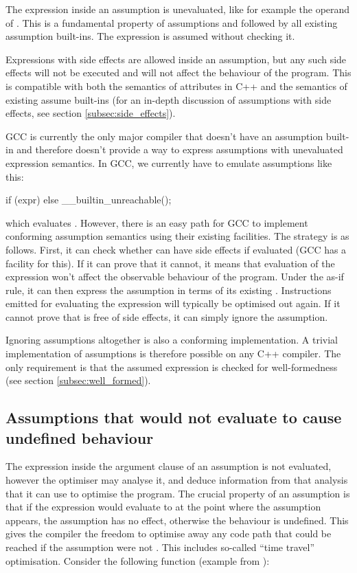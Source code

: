 The expression inside an assumption is unevaluated, like for example the operand of . This is a fundamental property of assumptions and followed by all existing assumption built-ins. The expression is assumed without checking it.

Expressions with side effects are allowed inside an assumption, but any such side effects will not be executed and will not affect the behaviour of the program. This is compatible with both the semantics of attributes in C++ and the semantics of existing assume built-ins (for an in-depth discussion of assumptions with side effects, see section \ref{subsec:side_effects}).

GCC is currently the only major compiler that doesn't have an assumption built-in and therefore doesn't provide a way to express assumptions with unevaluated expression semantics. In GCC, we currently have to emulate assumptions like this:

\begin{codeblock}
if (expr) {} else { __builtin_unreachable(); }
\end{codeblock}

which evaluates . However, there is an easy path for GCC to implement conforming assumption semantics using their existing facilities. The strategy is as follows. First, it can check whether  can have side effects if evaluated (GCC has a facility for this). If it can prove that it cannot, it means that evaluation of the expression won't affect the observable behaviour of the program. Under the as-if rule, it can then express the assumption in terms of its existing . Instructions emitted for evaluating the expression will typically be optimised out again. If it cannot prove that  is free of side effects, it can simply ignore the assumption.

Ignoring assumptions altogether is also a conforming implementation. A trivial implementation of assumptions is therefore possible on any C++ compiler. The only requirement is that the assumed expression is checked for well-formedness (see section \ref{subsec:well_formed}).

\subsection{Assumptions that would not evaluate to  cause undefined behaviour}

The expression inside the argument clause of an assumption is not evaluated, however the optimiser may analyse it, and deduce information from that analysis that it can use to optimise the program. The crucial property of an assumption is that if the expression would evaluate to  at the point where the assumption appears, the assumption has no effect, otherwise the behaviour is undefined. This gives the compiler the freedom to optimise away any code path that could be reached if the assumption were not . This includes so-called ``time travel'' optimisation. Consider the following function (example from \cite{P2064R0}):

